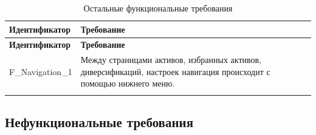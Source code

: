\documentclass[a4paper, 14pt]{article}
\begin{document}
\begin{longtable}{| p{} | p{} |}
    \hline
    \textbf{Идентификатор}          & \textbf{Требование}                                                                                                                                                                \\
    \hline
    \endfirsthead
    \hline
    \textbf{Идентификатор}          & \textbf{Требование}                                                                                                                                                                \\
    \hline
    \endhead

    F\_Navigation\_1                & Между страницами активов, избранных активов, диверсификаций, настроек навигация происходит с помощью нижнего меню.                                                                 \\ \hline

    \caption{Остальные функциональные требования}
\end{longtable}

\subsection{Нефункциональные требования}
\end{document}
